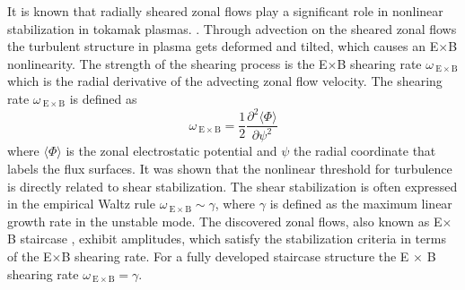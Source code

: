 \documentclass[aip, amsmath, amssymb, reprint, twocolumn]{revtex4-1}
\begin{document}


It is known that radially sheared zonal flows play a significant role in nonlinear stabilization in tokamak plasmas. \cite{WACooper1988,doi:10.1063/1.859529,doi:10.1063/1.873896}. 
Through advection on the sheared zonal flows the turbulent structure in plasma gets deformed and tilted, which causes an E$\times$B nonlinearity. \cite{doi:10.1063/1.859529, doi:10.1063/1.871313, doi:10.1063/1.872367}
The strength of the shearing process is the E$\times$B shearing rate $\omega_{\mathrm{\:E \times B}}$ which is the radial derivative of the advecting zonal flow velocity. \cite{doi:10.1063/1.871313, doi:10.1063/1.872847}
The shearing rate $\omega_{\mathrm{\:E \times B}}$ is defined as 
\begin{equation}
	\omega_{\mathrm{\:E \times B}} = \frac{1}{2} \frac{\partial^2 \langle \Phi \rangle}{\partial \psi^2}
	\label{eq:shearingrate}
\end{equation}
where $\langle \Phi \rangle$ is the zonal electrostatic potential and $\psi$ the radial coordinate that labels the flux surfaces. \cite{doi:10.1063/1.4952621, doi:10.1063/1.3005380}
It was shown that the nonlinear threshold for turbulence is directly related to shear stabilization. \cite{doi:10.1063/1.873896} %
The shear stabilization is often expressed in the empirical Waltz rule $\omega_{\mathrm{\:E \times B}} \sim \gamma$, \cite{doi:10.1063/1.870934, doi:10.1063/1.872847} where $\gamma$ is defined as the maximum linear growth rate in the unstable mode. The discovered zonal flows, also known as E$\times$B staircase \cite{PhysRevE.82.025401}, exhibit amplitudes, which satisfy the stabilization criteria in terms of the E$\times$B shearing rate. For a fully developed staircase structure the E $\times$ B shearing rate $\omega_{\mathrm{\:E \times B}} = \gamma$. \cite{doi:10.1063/1.4961231, doi:10.1063/1.4952621}\bigskip
\end{document}
